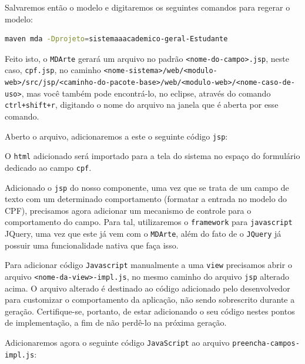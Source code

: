 Salvaremos então o modelo e digitaremos os seguintes comandos para regerar o
modelo:

\begin{lstlisting}[language=bash, frame=single, breaklines=true]
maven mda -Dprojeto=sistemaaacademico-geral-Estudante
\end{lstlisting}

Feito isto, o \texttt{MDArte} gerará um arquivo no padrão
\texttt{<nome-do-campo>.jsp}, neste caso, \texttt{cpf.jsp}, no caminho
\texttt{<nome-sistema>/web/<modulo-web>/src/jsp/<caminho-do-pacote-base>/web/<modulo-web>/<nome-caso-de-uso>},
mas você também pode encontrá-lo, no eclipse, através do comando
\texttt{ctrl+shift+r}, digitando o nome do arquivo na janela que é aberta por
esse comando.

Aberto o arquivo, adicionaremos a este o seguinte código \texttt{jsp}:



O \texttt{html} adicionado será importado para a tela do sistema no espaço do
formulário dedicado ao campo \texttt{cpf}.

Adicionado o \texttt{jsp} do nosso componente, uma vez que se trata de um campo
de texto com um determinado comportamento (formatar a entrada no modelo do CPF),
precisamos agora adicionar um mecanismo de controle para o comportamento do
campo. Para tal, utilizaremos o \texttt{framework} para \texttt{javascript}
JQuery, uma vez que este já vem com o \texttt{MDArte}, além do fato de o
\texttt{JQuery} já possuir uma funcionalidade nativa que faça isso.

Para adicionar código \texttt{Javascript} manualmente a uma \texttt{view}
precisamos abrir o arquivo \texttt{<nome-da-view>-impl.js}, no mesmo caminho
do arquivo \texttt{jsp} alterado acima. O arquivo alterado é destinado ao código
adicionado pelo desenvolvedor para customizar o comportamento da aplicação, não
sendo sobrescrito durante a geração. Certifique-se, portanto, de estar
adicionando o seu código nestes pontos de implementação, a fim de não perdê-lo
na próxima geração.

Adicionaremos agora o seguinte código \texttt{JavaScript} ao arquivo
\texttt{preencha-campos-impl.js}:

